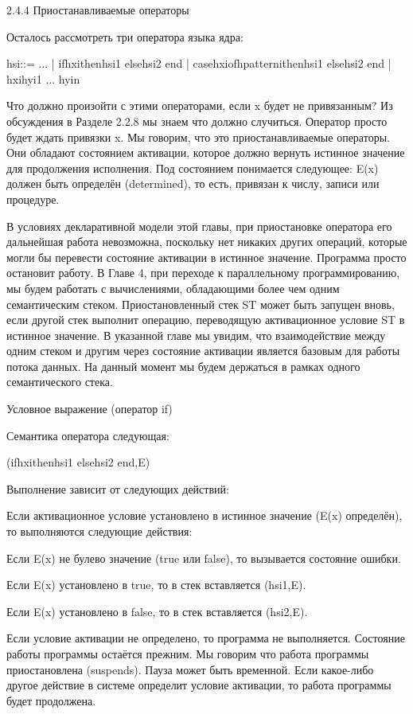 2.4.4 Приостанавливаемые операторы

Осталось рассмотреть три оператора языка ядра:

hsi::= ...
| ifhxithenhsi1 elsehsi2 end
| casehxiofhpatternithenhsi1 elsehsi2 end
| {hxihyi1 ... hyin}

Что должно произойти с этими операторами, если x будет не привязанным? Из обсуждения в Разделе 2.2.8 мы знаем что должно случиться. Оператор просто будет ждать привязки x. Мы говорим, что это приостанавливаемые операторы. Они обладают состоянием активации, которое должно вернуть истинное значение для продолжения исполнения. Под состоянием понимается следующее: E(x) должен быть определён (determined), то есть, привязан к числу, записи или процедуре.

В условиях декларативной модели этой главы, при приостановке оператора его дальнейшая работа невозможна, поскольку нет никаких других операций, которые могли бы перевести состояние активации в истинное значение. Программа просто остановит работу. В Главе 4, при переходе к параллельному программированию, мы будем работать с вычислениями, обладающими более чем одним семантическим стеком. Приостановленный стек ST может быть запущен вновь, если другой стек выполнит операцию, переводящую активационное условие ST в истинное значение. В указанной главе мы увидим, что взаимодействие между одним стеком и другим через состояние активации является базовым для работы потока данных. На данный момент мы будем держаться в рамках одного семантического стека.

Условное выражение (оператор if)

Семантика оператора следующая:

(ifhxithenhsi1 elsehsi2 end,E)

Выполнение зависит от следующих действий:

Если активационное условие установлено в истинное значение (E(x) определён), то выполняются следующие действия:

Если E(x) не булево значение (true или false), то вызывается состояние ошибки.

Если E(x) установлено в true, то в стек вставляется (hsi1,E).

Если E(x) установлено в false, то в стек вставляется (hsi2,E).

Если условие активации не определено, то программа не выполняется. Состояние работы программы остаётся прежним. Мы говорим что работа программы приостановлена (suspends). Пауза может быть временной. Если какое-либо другое действие в системе определит условие активации, то работа программы будет продолжена.

